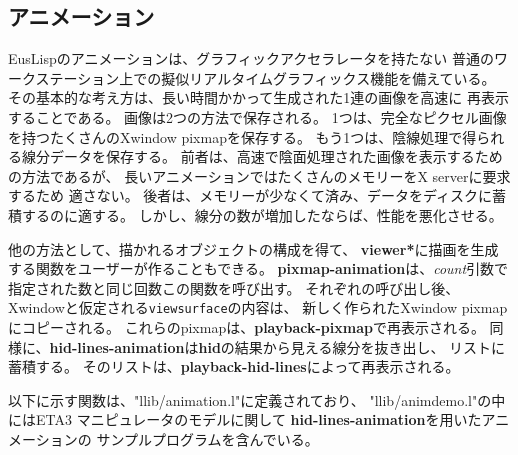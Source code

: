 \subsection{アニメーション}
EusLispのアニメーションは、グラフィックアクセラレータを持たない
普通のワークステーション上での擬似リアルタイムグラフィックス機能を備えている。
その基本的な考え方は、長い時間かかって生成された1連の画像を高速に
再表示することである。
画像は2つの方法で保存される。
1つは、完全なピクセル画像を持つたくさんのXwindow pixmapを保存する。
もう1つは、陰線処理で得られる線分データを保存する。
前者は、高速で陰面処理された画像を表示するための方法であるが、
長いアニメーションではたくさんのメモリーをX serverに要求するため
適さない。
後者は、メモリーが少なくて済み、データをディスクに蓄積するのに適する。
しかし、線分の数が増加したならば、性能を悪化させる。

他の方法として、描かれるオブジェクトの構成を得て、
{\bf *viewer*}に描画を生成する関数をユーザーが作ることもできる。
{\bf pixmap-animation}は、{\em count}引数で指定された数と同じ回数この関数を呼び出す。
それぞれの呼び出し後、Xwindowと仮定される{\tt viewsurface}の内容は、
新しく作られたXwindow pixmapにコピーされる。
これらのpixmapは、{\bf playback-pixmap}で再表示される。
同様に、{\bf hid-lines-animation}は{\bf hid}の結果から見える線分を抜き出し、
リストに蓄積する。
そのリストは、{\bf playback-hid-lines}によって再表示される。

以下に示す関数は、"llib/animation.l"に定義されており、
"llib/animdemo.l"の中にはETA3 マニピュレータのモデルに関して
{\bf hid-lines-animation}を用いたアニメーションの
サンプルプログラムを含んでいる。

\begin{refdesc}



\end{refdesc}

\newpage
